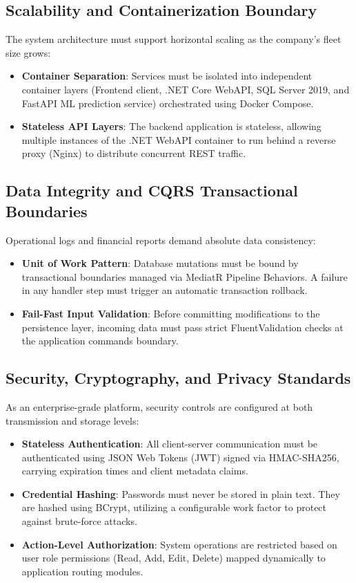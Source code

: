 \subsection{Scalability and Containerization Boundary}
The system architecture must support horizontal scaling as the company's fleet size grows:
\begin{itemize}
  \item \textbf{Container Separation}: Services must be isolated into independent container layers (Frontend client, .NET Core WebAPI, SQL Server 2019, and FastAPI ML prediction service) orchestrated using Docker Compose.
  \item \textbf{Stateless API Layers}: The backend application is stateless, allowing multiple instances of the .NET WebAPI container to run behind a reverse proxy (Nginx) to distribute concurrent REST traffic.
\end{itemize}

\subsection{Data Integrity and CQRS Transactional Boundaries}
Operational logs and financial reports demand absolute data consistency:
\begin{itemize}
  \item \textbf{Unit of Work Pattern}: Database mutations must be bound by transactional boundaries managed via MediatR Pipeline Behaviors. A failure in any handler step must trigger an automatic transaction rollback.
  \item \textbf{Fail-Fast Input Validation}: Before committing modifications to the persistence layer, incoming data must pass strict FluentValidation checks at the application commands boundary.
\end{itemize}

\subsection{Security, Cryptography, and Privacy Standards}
As an enterprise-grade platform, security controls are configured at both transmission and storage levels:
\begin{itemize}
  \item \textbf{Stateless Authentication}: All client-server communication must be authenticated using JSON Web Tokens (JWT) signed via HMAC-SHA256, carrying expiration times and client metadata claims.
  \item \textbf{Credential Hashing}: Passwords must never be stored in plain text. They are hashed using BCrypt, utilizing a configurable work factor to protect against brute-force attacks.
  \item \textbf{Action-Level Authorization}: System operations are restricted based on user role permissions (Read, Add, Edit, Delete) mapped dynamically to application routing modules.
\end{itemize}

